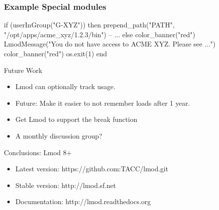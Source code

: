 \documentclass{beamer}
\begin{document}
\begin{frame}[fragile]
\frametitle{Example Special modules}
{\tiny
\begin{semiverbatim}
    if (userInGroup("G-XYZ")) then
       prepend\_path("PATH", "/opt/apps/acme\_xyz/1.2.3/bin")
       -- ...
    else
       color\_banner("red")
       LmodMessage("You do not have access to ACME XYZ.  Please see ...")
       color\_banner("red")
       os.exit(1)
    end
\end{semiverbatim}
}
\end{frame}


\begin{frame}{Future Work}
  \begin{itemize}
    \item Lmod can optionally track usage.
    \item Future: Make it easier to not remember loads after 1 year.
    \item Get Lmod to support the break function
    \item A monthly discussion group?
  \end{itemize}
\end{frame}


\begin{frame}{Conclusions: Lmod 8+}
  \begin{itemize}
    \item Latest version: https://github.com:TACC/lmod.git
    \item Stable version: http://lmod.sf.net
    \item Documentation:  http://lmod.readthedocs.org
  \end{itemize}
\end{frame}
\end{document}
